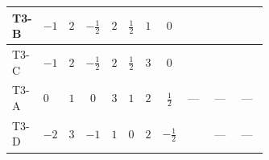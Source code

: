 \documentclass[8pt]{article}
\begin{document}
\begin{landscape}
\begin{longtable}{@{}llcccccc >{\raggedright\arraybackslash}p{0.21\linewidth} >{\raggedright\arraybackslash}p{0.21\linewidth} >{\raggedright\arraybackslash}p{0.21\linewidth}@{}}
T3-B & $-1$ & $2$ & $-\frac{1}{2}$ & $2$ & $\frac{1}{2}$ & $1$ & $0$ & \scriptsize\adjustbox{max width=\linewidth}{$\begin{gathered} {\lambda_{H2}} (6 \operatorname{Tr}\!\left({Y_d}\,\left({Y_d}\right)^{\dagger}\right)+2 \operatorname{Tr}\!\left({Y_e}\,\left({Y_e}\right)^{\dagger}\right)+6 \operatorname{Tr}\!\left({Y_u}\,\left({Y_u}\right)^{\dagger}\right))\end{gathered}$} & \scriptsize\adjustbox{max width=\linewidth}{$\begin{gathered} +3 {\lambda_{S_1^\dagger S_2 S_2^{\dagger 2}}} \left({\lambda_{H H^\dagger S_1^\dagger S_2^\dagger}^{\rm Cross}}\right)^{*}\end{gathered}$} & \scriptsize\adjustbox{max width=\linewidth}{$\begin{gathered} +{\lambda_{H H^\dagger S_1^\dagger S_2^\dagger}^{\rm Cross}} (4 \left({\lambda_{H H^\dagger S_1^\dagger S_2^\dagger}^{\rm Cross}}\right)^{*}+3 \left({\lambda_{S_1^\dagger S_2 S_2^{\dagger 2}}}\right)^{*})\end{gathered}$} \\
\midrule
T3-C & $-1$ & $2$ & $-\frac{1}{2}$ & $2$ & $\frac{1}{2}$ & $3$ & $0$ & \scriptsize\adjustbox{max width=\linewidth}{$\begin{gathered} {\lambda_{H2}} (6 \operatorname{Tr}\!\left({Y_d}\,\left({Y_d}\right)^{\dagger}\right)+2 \operatorname{Tr}\!\left({Y_e}\,\left({Y_e}\right)^{\dagger}\right)+6 \operatorname{Tr}\!\left({Y_u}\,\left({Y_u}\right)^{\dagger}\right))\end{gathered}$} & \scriptsize\adjustbox{max width=\linewidth}{$\begin{gathered} +3 {\lambda_{S_1^\dagger S_2 S_2^{\dagger 2}}} \left({\lambda_{H H^\dagger S_1^\dagger S_2^\dagger}^{\rm Cross}}\right)^{*}\end{gathered}$} & \scriptsize\adjustbox{max width=\linewidth}{$\begin{gathered} +{\lambda_{H H^\dagger S_1^\dagger S_2^\dagger}^{\rm Cross}} (4 \left({\lambda_{H H^\dagger S_1^\dagger S_2^\dagger}^{\rm Cross}}\right)^{*}+3 \left({\lambda_{S_1^\dagger S_2 S_2^{\dagger 2}}}\right)^{*})\end{gathered}$} \\
\midrule
T3-A & $0$ & $1$ & $0$ & $3$ & $1$ & $2$ & $\frac{1}{2}$ & --- & --- & --- \\
\midrule
T3-D & $-2$ & $3$ & $-1$ & $1$ & $0$ & $2$ & $-\frac{1}{2}$ & \scriptsize\adjustbox{max width=\linewidth}{$\begin{gathered} {\lambda_{H2}} (6 \operatorname{Tr}\!\left({Y_d}\,\left({Y_d}\right)^{\dagger}\right)+2 \operatorname{Tr}\!\left({Y_e}\,\left({Y_e}\right)^{\dagger}\right)+6 \operatorname{Tr}\!\left({Y_u}\,\left({Y_u}\right)^{\dagger}\right))\end{gathered}$} & --- & --- \\

\end{longtable}
\end{landscape}
\end{document}
